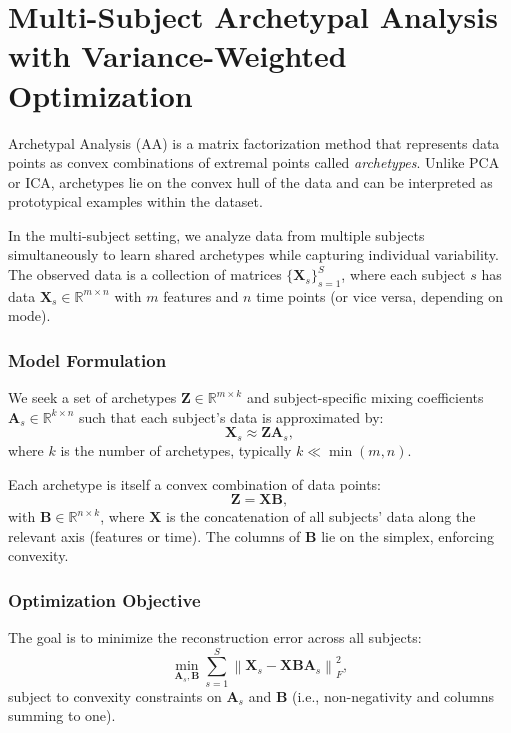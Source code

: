 \documentclass[12pt]{article}
\begin{document}
\section*{Multi-Subject Archetypal Analysis with Variance-Weighted Optimization}

Archetypal Analysis (AA) \citep{CutlEtal94} is a matrix factorization method that represents data points as convex combinations of extremal points called \emph{archetypes}. Unlike PCA or ICA, archetypes lie on the convex hull of the data and can be interpreted as prototypical examples within the dataset. 

In the multi-subject setting, we analyze data from multiple subjects simultaneously to learn shared archetypes while capturing individual variability. The observed data is a collection of matrices $\{ \mathbf{X}_s \}_{s=1}^S$, where each subject $s$ has data $\mathbf{X}_s \in \mathbb{R}^{m \times n}$ with $m$ features and $n$ time points (or vice versa, depending on mode).

\subsubsection*{Model Formulation}

We seek a set of archetypes $\mathbf{Z} \in \mathbb{R}^{m \times k}$ and subject-specific mixing coefficients $\mathbf{A}_s \in \mathbb{R}^{k \times n}$ such that each subject's data is approximated by:
\[
\mathbf{X}_s \approx \mathbf{Z} \mathbf{A}_s,
\]
where $k$ is the number of archetypes, typically $k \ll \min(m, n)$. 

Each archetype is itself a convex combination of data points:
\[
\mathbf{Z} = \mathbf{X} \mathbf{B},
\]
with $\mathbf{B} \in \mathbb{R}^{n \times k}$, where $\mathbf{X}$ is the concatenation of all subjects' data along the relevant axis (features or time). The columns of $\mathbf{B}$ lie on the simplex, enforcing convexity.

\subsubsection*{Optimization Objective}

The goal is to minimize the reconstruction error across all subjects:
\[
\min_{\mathbf{A}_s, \mathbf{B}} \sum_{s=1}^S \left\| \mathbf{X}_s - \mathbf{X} \mathbf{B} \mathbf{A}_s \right\|_F^2,
\]
subject to convexity constraints on $\mathbf{A}_s$ and $\mathbf{B}$ (i.e., non-negativity and columns summing to one).
\end{document}
